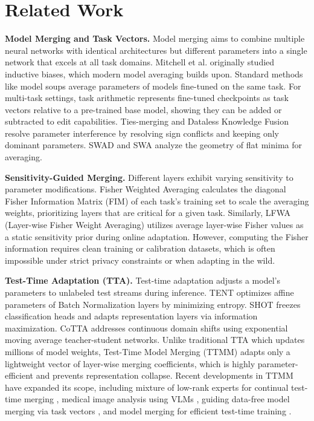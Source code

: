 \documentclass{article}
\theoremstyle{plain}
\theoremstyle{definition}
\theoremstyle{remark}
\begin{document}
\section{Related Work}
\label{sec:related}
\textbf{Model Merging and Task Vectors.} Model merging aims to combine multiple neural networks with identical architectures but different parameters into a single network that excels at all task domains. Mitchell et al. \cite{mitchell80} originally studied inductive biases, which modern model averaging builds upon. Standard methods like model soups \cite{wortsman22modelsoups} average parameters of models fine-tuned on the same task. For multi-task settings, task arithmetic \cite{ilharco22taskvectors} represents fine-tuned checkpoints as task vectors relative to a pre-trained base model, showing they can be added or subtracted to edit capabilities. Ties-merging \cite{yadav23tiesmerging} and Dataless Knowledge Fusion \cite{jin22knowledgefusion} resolve parameter interference by resolving sign conflicts and keeping only dominant parameters. SWAD \cite{cha21swad} and SWA \cite{izmailov18swa} analyze the geometry of flat minima for averaging.

\textbf{Sensitivity-Guided Merging.} Different layers exhibit varying sensitivity to parameter modifications. Fisher Weighted Averaging \cite{matena22fisher} calculates the diagonal Fisher Information Matrix (FIM) of each task's training set to scale the averaging weights, prioritizing layers that are critical for a given task. Similarly, LFWA (Layer-wise Fisher Weight Averaging) utilizes average layer-wise Fisher values as a static sensitivity prior during online adaptation. However, computing the Fisher information requires clean training or calibration datasets, which is often impossible under strict privacy constraints or when adapting in the wild.

\textbf{Test-Time Adaptation (TTA).} Test-time adaptation adjusts a model's parameters to unlabeled test streams during inference. TENT \cite{wang21tent} optimizes affine parameters of Batch Normalization layers by minimizing entropy. SHOT \cite{liang22shot} freezes classification heads and adapts representation layers via information maximization. CoTTA \cite{ni23cotta} addresses continuous domain shifts using exponential moving average teacher-student networks. Unlike traditional TTA which updates millions of model weights, Test-Time Model Merging (TTMM) \cite{yang23adamerging} adapts only a lightweight vector of layer-wise merging coefficients, which is highly parameter-efficient and prevents representation collapse. Recent developments in TTMM have expanded its scope, including mixture of low-rank experts for continual test-time merging \cite{qiu2025mingle}, medical image analysis using VLMs \cite{imam2025t3}, guiding data-free model merging via task vectors \cite{cheng2025whoever}, and model merging for efficient test-time training \cite{bertolissi2025local}.
\end{document}
